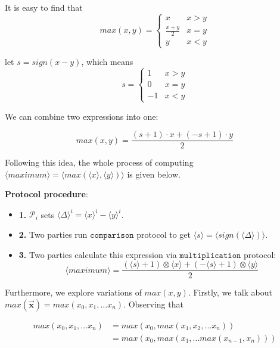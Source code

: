 \documentclass[letterpaper]{article} %
\begin{document}
       It is easy to find that
       $$max(x,y) = \left\{\begin{matrix}
           x & x>y\\
           \frac{x+ y}{2} & x=y\\
           y & x<y
           \end{matrix}\right.$$

       let $s = sign(x-y)$, which means
       $$s = \left\{\begin{matrix}
           1 & x>y\\
           0 & x=y\\
           -1 & x<y
           \end{matrix}\right.$$

       We can combine two expressions into one:

       $$max(x,y) = \frac{(s+1)\cdot x+ (-s+1)\cdot y}{2}$$


       Following this idea, the whole process of computing $\langle maximum\rangle  = \langle max(\langle x\rangle,\langle y\rangle)\rangle$ is given below.

       \textbf{Protocol procedure}:
       \begin{itemize}
           \item \textbf{1.} $\mathcal{P}_{i}$ sets $\langle \Delta \rangle^{i}=\langle x\rangle ^{i}-\langle y\rangle ^{i}$.
           \item \textbf{2.} Two parties run $\mathtt{comparison}$ protocol to get $\langle s\rangle =\langle sign(\langle \Delta \rangle)\rangle$.%
           \item \textbf{3.} Two parties calculate this expression via $\mathtt{multiplication}$ protocol:
           $$\langle maximum\rangle=\frac{(\langle s\rangle+1)\otimes \langle x\rangle+ (-\langle s\rangle+1)\otimes \langle y\rangle}{2}$$
       \end{itemize}

       Furthermore, we explore variations of $max(x,y)$.
       Firstly, we talk about $max(\overrightarrow{\mathbf{x}})=max(x_{0},x_{1},...x_{n})$. Observing that

       \begin{align*}
           max(x_{0},x_{1},...x_{n}) &= max(x_{0},max(x_{1},x_{2},...x_{n})) \\
         &= max(x_{0},max(x_{1},...max(x_{n-1},x_{n})))
       \end{align*}
\end{document}
